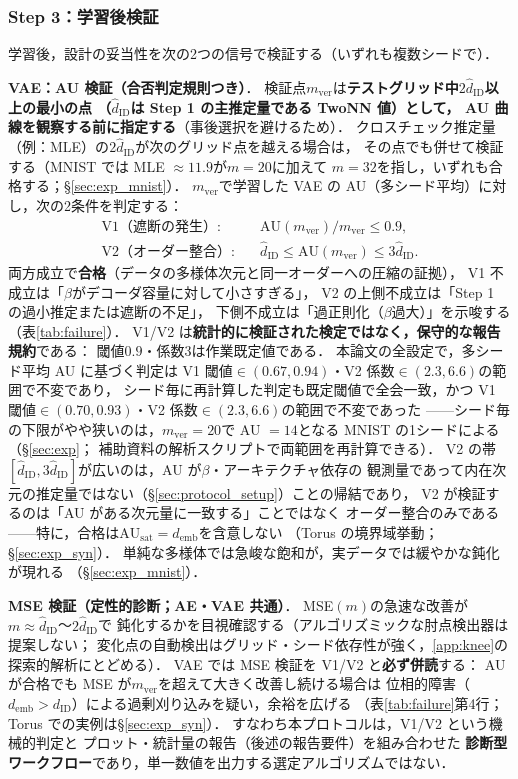 \documentclass[11pt,a4paper]{jsarticle}
\newcommand{\dID}{d_{\mathrm{ID}}}
\newcommand{\hatdID}{\hat{d}_{\mathrm{ID}}}
\newcommand{\AUsat}{\mathrm{AU}_{\mathrm{sat}}}
\newcommand{\demb}{d_{\mathrm{emb}}}
\begin{document}
\subsubsection{Step 3：学習後検証}\label{sec:protocol_s3}

学習後，設計の妥当性を次の2つの信号で検証する（いずれも複数シードで）．

\textbf{VAE：AU 検証（合否判定規則つき）}．
検証点$m_{\mathrm{ver}}$は\textbf{テストグリッド中$2\hatdID$以上の最小の点
（$\hatdID$は Step 1 の主推定量である TwoNN 値）として，
AU 曲線を観察する前に指定する}（事後選択を避けるため）．
クロスチェック推定量（例：MLE）の$2\hatdID$が次のグリッド点を越える場合は，
その点でも併せて検証する（MNIST では MLE $\approx 11.9$が$m = 20$に加えて
$m = 32$を指し，いずれも合格する；§\ref{sec:exp_mnist}）．
$m_{\mathrm{ver}}$で学習した VAE の AU（多シード平均）に対し，次の2条件を判定する：
\begin{align}
  \text{V1（遮断の発生）}:&\quad \mathrm{AU}(m_{\mathrm{ver}}) / m_{\mathrm{ver}} \leq 0.9,
  \label{eq:rule_v1}\\
  \text{V2（オーダー整合）}:&\quad \hatdID \leq \mathrm{AU}(m_{\mathrm{ver}}) \leq 3\hatdID.
  \label{eq:rule_v2}
\end{align}
両方成立で\textbf{合格}（データの多様体次元と同一オーダーへの圧縮の証拠），
V1 不成立は「$\beta$がデコーダ容量に対して小さすぎる」，
V2 の上側不成立は「Step 1 の過小推定または遮断の不足」，
下側不成立は「過正則化（$\beta$過大）」を示唆する（表\ref{tab:failure}）．
V1/V2 は\textbf{統計的に検証された検定ではなく，保守的な報告規約}である：
閾値$0.9$・係数$3$は作業既定値である．
本論文の全設定で，多シード平均 AU に基づく判定は
V1 閾値$\in (0.67, 0.94)$・V2 係数$\in (2.3, 6.6)$の範囲で不変であり，
シード毎に再計算した判定も既定閾値で全会一致，かつ
V1 閾値$\in (0.70, 0.93)$・V2 係数$\in (2.3, 6.6)$の範囲で不変であった
——シード毎の下限がやや狭いのは，$m_{\mathrm{ver}} = 20$で AU $= 14$となる
MNIST の1シードによる（§\ref{sec:exp}；
補助資料の解析スクリプトで両範囲を再計算できる）．
V2 の帯$[\hatdID, 3\hatdID]$が広いのは，AU が$\beta$・アーキテクチャ依存の
観測量であって内在次元の推定量ではない（§\ref{sec:protocol_setup}）ことの帰結であり，
V2 が検証するのは「AU がある次元量に一致する」ことではなく
オーダー整合のみである——特に，合格は$\AUsat = \demb$を含意しない
（Torus の境界域挙動；§\ref{sec:exp_syn}）．
単純な多様体では急峻な飽和が，実データでは緩やかな鈍化が現れる
（§\ref{sec:exp_mnist}）．

\textbf{MSE 検証（定性的診断；AE・VAE 共通）}．
MSE$(m)$の急速な改善が$m \approx \hatdID$〜$2\hatdID$で
鈍化するかを目視確認する（アルゴリズミックな肘点検出器は提案しない；
変化点の自動検出はグリッド・シード依存性が強く，\ref{app:knee}の
探索的解析にとどめる）．
VAE では MSE 検証を V1/V2 と\textbf{必ず併読}する：
AU が合格でも MSE が$m_{\mathrm{ver}}$を超えて大きく改善し続ける場合は
位相的障害（$\demb > \dID$）による過剰刈り込みを疑い，余裕を広げる
（表\ref{tab:failure}第4行；Torus での実例は§\ref{sec:exp_syn}）．
すなわち本プロトコルは，V1/V2 という機械的判定と
プロット・統計量の報告（後述の報告要件）を組み合わせた
\textbf{診断型ワークフロー}であり，単一数値を出力する選定アルゴリズムではない．
\end{document}

